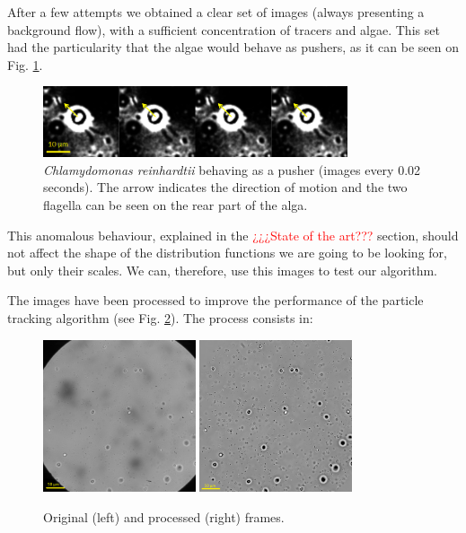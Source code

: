 
After a few attempts we obtained a clear set of images (always presenting a background flow), with a sufficient concentration of tracers and algae. This set had the particularity that the algae would behave as pushers, as it can be seen on Fig. \ref{chlamy_pusher}. 

\begin{figure}[H]
	\centering
	\includegraphics[width=0.8\textwidth]{archivos/chlamy_pusher.png}
	\caption{\textit{Chlamydomonas reinhardtii} behaving as a pusher (images every 0.02 seconds). The arrow indicates the direction of motion and the two flagella can be seen on the rear part of the alga.}
	\label{chlamy_pusher}
\end{figure}

This anomalous behaviour, explained in the \textcolor{red}{¿¿¿State of the art???} section, should not affect the shape of the distribution functions we are going to be looking for, but only their scales. We can, therefore, use this images to test our algorithm.

The images have been processed to improve the performance of the particle tracking algorithm (see Fig. \ref{orbpe3}). The process consists in:

\begin{figure}[H]
	\centering
	\includegraphics[width=0.4\textwidth]{archivos/frame_01_e3.png}
	\includegraphics[width=0.4\textwidth]{archivos/frame_01_e3_bp.png}
	\caption{Original (left) and processed (right) frames.}
	\label{orbpe3}
\end{figure}

